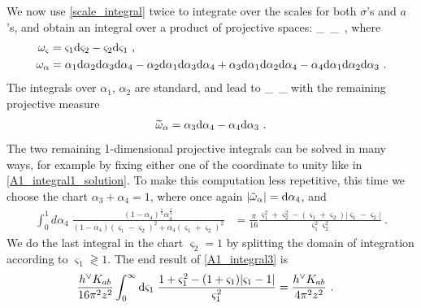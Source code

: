 \documentclass[11pt]{amsart}
\numberwithin{equation}{section}
\numberwithin{figure}{section}
\numberwithin{table}{section}
\begin{document}
We now use \cref{scale_integral} twice to integrate over the scales for both $\sigma$'s and $a$'s, and obtain an integral over a product of projective spaces:
\be
	 \int\omega_\varsigma~\omega_\alpha {}~,
\ee
where
\begin{align*}
		\omega_\varsigma &= \varsigma_1 \mathrm{d} \varsigma_2 - \varsigma_2 \mathrm{d} \varsigma_1~,\\
		\omega_\alpha &= \alpha_1 \mathrm{d} \alpha_2\mathrm{d} \alpha_3\mathrm{d} \alpha_4 - \alpha_2 \mathrm{d} \alpha_1\mathrm{d} \alpha_3\mathrm{d} \alpha_4 + \alpha_3\mathrm{d} \alpha_1\mathrm{d} \alpha_2\mathrm{d} \alpha_4 - \alpha_4 \mathrm{d} \alpha_1\mathrm{d} \alpha_2\mathrm{d} \alpha_3~.
\end{align*}
The integrals over $\alpha_1$, $\alpha_2$ are standard, and lead to
\be \label{A1_1loop_projective_rest}
	 \int\omega_\varsigma~\wt{\omega}_\alpha {}
\ee
with the remaining projective measure
\begin{align}\label{remaining_projective_measure}
		\widetilde{\omega}_\alpha = \alpha_3 \mathrm{d} \alpha_4 - \alpha_4 \mathrm{d} \alpha_3~.
\end{align}
The two remaining 1-dimensional projective integrals can be solved in many ways, for example by fixing either one of the coordinate to unity like in \cref{A1_integral1_solution}.
To make this computation less repetitive, this time we choose the chart $\alpha_3+\alpha_4=1$, where once again $|\tilde \omega_\alpha|= \mathrm{d} \alpha_4$, and 
\begin{align}
	\int_0^1 d \alpha_4 \;  \frac{ (1-\alpha_4)^{\scriptstyle{\frac{1}{2}}}\alpha_4^{\scriptstyle{\frac{1}{2}}}}{  (1-\alpha_4)(\varsigma_1 - \varsigma_2)^2 + \alpha_4(\varsigma_1 + \varsigma_2)^2 }&=\frac{\pi}{16}\frac{ \varsigma_1^2 + \varsigma_2^2 - (\varsigma_1+\varsigma_2) |\varsigma_1-\varsigma_2| }{\varsigma_1^2 \varsigma_2^2}~.
\end{align}
We do the last integral  in the chart $\varsigma_2=1$ by splitting the domain of integration according to  $\varsigma_1 \gtrless 1$.
The end result of \cref{A1_integral3} is
\begin{align}
	\frac{h^\vee K_{ab}}{16 \pi^2 z^2}\int_0^\infty \mathrm{d} \varsigma_1 \; \frac{ 1+\varsigma_1^2  - (1+\varsigma_1) |\varsigma_1-1| }{  \varsigma_1^2  } &= \frac{h^\vee K_{ab}}{4 \pi^2 z^2}~.
\end{align}
\end{document}
